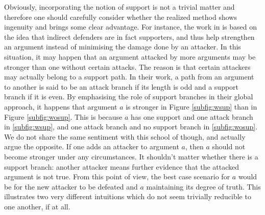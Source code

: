 \documentclass{article}
\begin{document}
{\color{red} 


Obviously, incorporating the notion of support is not a trivial matter and therefore one should carefully consider whether the realized method shows ingenuity and brings some clear advantage. 
For instance, the work in \cite{gradinarg} is based on the idea that indirect defenders are in fact supporters, and thus help strengthen an argument instead of minimising the damage done by an attacker. In this situation, it may happen that an argument attacked by more arguments may be stronger than one without certain attacks. The reason is that certain attackers may actually belong to a support path. In their work, a path from an argument to another is said to be an attack branch if its length is odd and a support branch if it is even. By emphasising the role of support branches in their global approach, it happens that argument $a$ is stronger in Figure \ref{subfig:wsup} than in Figure \ref{subfig:wosup}. This is because $a$ has one support and one attack branch in \ref{subfig:wsup}, and one attack branch and no support branch in \ref{subfig:wosup}. We do not share the same sentiment with this school of though, and actually argue the opposite. If one adds an attacker to argument $a$, then $a$ should not become stronger under any circumstances. It shouldn't matter whether there is a support branch: another attacker means further evidence that the attacked argument is not true. From this point of view, the best case scenario for $a$ would be for the new attacker to be defeated and $a$ maintaining its degree of truth. This illustrates two very different intuitions which do not seem trivially reducible to one another, if at all.

\begin{figure}[h!]
  \centering
   \hspace{1cm}
\end{figure}}
\end{document}
